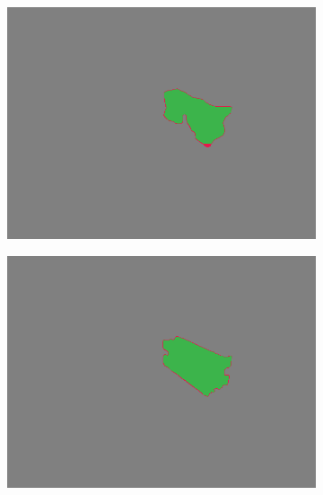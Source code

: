 \begin{figure}[h]
\begin{subfigure}{.24\textwidth}
			\includegraphics[width=1\linewidth]{images/sample_predictions/s40_40_G_013_mob_size_pred}
		\end{subfigure}
		\begin{subfigure}{.24\textwidth}
			\centering
			\includegraphics[width=1\linewidth]{images/sample_predictions/s40_40_G_013_xcep_size_pred}
		\end{subfigure}
		\begin{subfigure}{.24\textwidth}
			\centering

\end{subfigure}
\end{figure}
